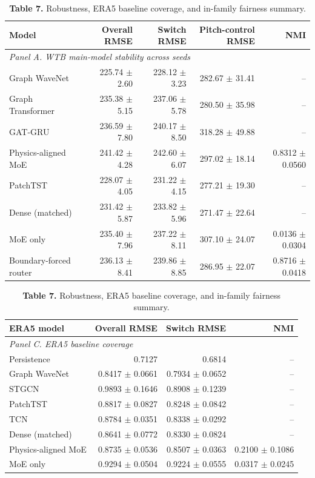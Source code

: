 \begin{table}[t]
\centering
\scriptsize
\setlength{\tabcolsep}{4pt}
\renewcommand{\arraystretch}{1.00}
\caption*{\textbf{Table 7.} Robustness, ERA5 baseline coverage, and in-family fairness summary.}
\begin{tabular}{lrrrr}
\toprule
Model & Overall RMSE & Switch RMSE & Pitch-control RMSE & NMI \\
\midrule
\multicolumn{5}{l}{\textit{Panel A. WTB main-model stability across seeds}} \\
Graph WaveNet & 225.74 $\pm$ 2.60 & 228.12 $\pm$ 3.23 & 282.67 $\pm$ 31.41 & -- \\
Graph Transformer & 235.38 $\pm$ 5.15 & 237.06 $\pm$ 5.78 & 280.50 $\pm$ 35.98 & -- \\
GAT-GRU & 236.59 $\pm$ 7.80 & 240.17 $\pm$ 8.50 & 318.28 $\pm$ 49.88 & -- \\
Physics-aligned MoE & 241.42 $\pm$ 4.28 & 242.60 $\pm$ 6.07 & 297.02 $\pm$ 18.14 & 0.8312 $\pm$ 0.0560 \\
PatchTST & 228.07 $\pm$ 4.05 & 231.22 $\pm$ 4.15 & 277.21 $\pm$ 19.30 & -- \\
Dense (matched) & 231.42 $\pm$ 5.87 & 233.82 $\pm$ 5.96 & 271.47 $\pm$ 22.64 & -- \\
MoE only & 235.40 $\pm$ 7.96 & 237.22 $\pm$ 8.11 & 307.10 $\pm$ 24.07 & 0.0136 $\pm$ 0.0304 \\
Boundary-forced router & 236.13 $\pm$ 8.41 & 239.86 $\pm$ 8.85 & 286.95 $\pm$ 22.07 & 0.8716 $\pm$ 0.0418 \\
\bottomrule
\end{tabular}

\vspace{0.25em}
\begin{tabular}{lrrr}
\toprule
ERA5 model & Overall RMSE & Switch RMSE & NMI \\
\midrule
\multicolumn{4}{l}{\textit{Panel C. ERA5 baseline coverage}} \\
Persistence & 0.7127 & 0.6814 & -- \\
Graph WaveNet & 0.8417 $\pm$ 0.0661 & 0.7934 $\pm$ 0.0652 & -- \\
STGCN & 0.9893 $\pm$ 0.1646 & 0.8908 $\pm$ 0.1239 & -- \\
PatchTST & 0.8817 $\pm$ 0.0827 & 0.8248 $\pm$ 0.0842 & -- \\
TCN & 0.8784 $\pm$ 0.0351 & 0.8338 $\pm$ 0.0292 & -- \\
Dense (matched) & 0.8641 $\pm$ 0.0772 & 0.8330 $\pm$ 0.0824 & -- \\
Physics-aligned MoE & 0.8735 $\pm$ 0.0536 & 0.8507 $\pm$ 0.0363 & 0.2100 $\pm$ 0.1086 \\
MoE only & 0.9294 $\pm$ 0.0504 & 0.9224 $\pm$ 0.0555 & 0.0317 $\pm$ 0.0245 \\
\bottomrule
\end{tabular}


\end{table}
